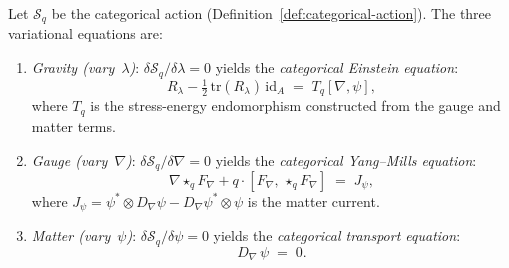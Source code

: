 \begin{proposition}
\label{prop:variational-equations}
Let $\mathcal{S}_q$ be the categorical action
(Definition~\ref{def:categorical-action}).  The three variational
equations are:
\begin{enumerate}
  \item \emph{Gravity (vary~$\lambda$)}:
    $\delta\mathcal{S}_q / \delta\lambda = 0$ yields the
    \emph{categorical Einstein equation}:
    \[
      R_\lambda - \tfrac{1}{2}\,\mathrm{tr}(R_\lambda)\,\mathrm{id}_A
      \;=\; T_q[\nabla, \psi],
    \]
    where $T_q$ is the stress-energy endomorphism constructed from the
    gauge and matter terms.
  \item \emph{Gauge (vary~$\nabla$)}:
    $\delta\mathcal{S}_q / \delta\nabla = 0$ yields the
    \emph{categorical Yang--Mills equation}:
    \[
      \nabla \star_q F_\nabla + q \cdot [F_\nabla,\, \star_q F_\nabla]
      \;=\; J_\psi,
    \]
    where $J_\psi = \psi^* \otimes D_\nabla\psi - D_\nabla\psi^* \otimes \psi$
    is the matter current.
  \item \emph{Matter (vary~$\psi$)}:
    $\delta\mathcal{S}_q / \delta\psi = 0$ yields the
    \emph{categorical transport equation}:
    \[
      D_\nabla\,\psi \;=\; 0.
    \]
\end{enumerate}
\end{proposition}

